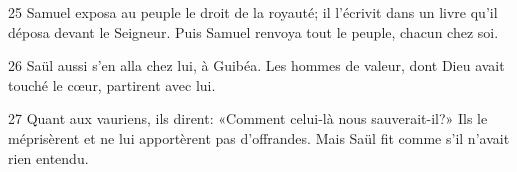 
25 Samuel exposa au peuple le droit de la royauté; il l’écrivit dans un livre qu’il déposa devant le Seigneur. Puis Samuel renvoya tout le peuple, chacun chez soi.

26 Saül aussi s’en alla chez lui, à Guibéa. Les hommes de valeur, dont Dieu avait touché le cœur, partirent avec lui.

27 Quant aux vauriens, ils dirent: «Comment celui-là nous sauverait-il?» Ils le méprisèrent et ne lui apportèrent pas d’offrandes. Mais Saül fit comme s’il n’avait rien entendu.